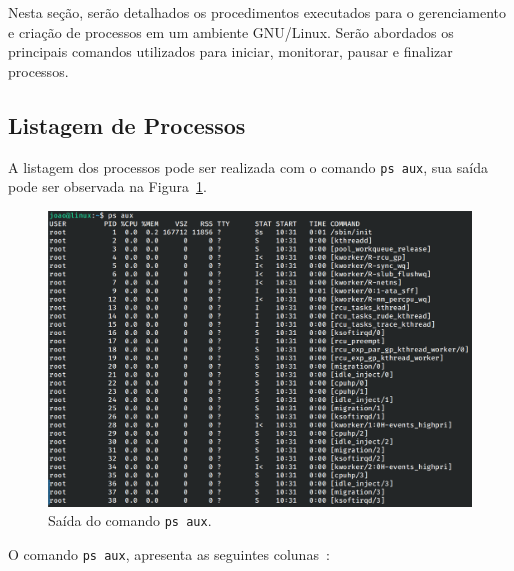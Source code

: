 \documentclass[
	12pt,				%
	oneside,   	        %
	a4paper,			%
	english,			%
	french,				%
	spanish,			%
	brazil,				%
	]{pacotes/abntex2}
\begin{document}
Nesta seção, serão detalhados os procedimentos executados para o gerenciamento e criação de processos em um ambiente GNU/Linux. Serão abordados os principais comandos utilizados para iniciar, monitorar, pausar e finalizar processos.

\subsection{Listagem de Processos}
\label{subsec:proc}

A listagem dos processos pode ser realizada com o comando \texttt{ps aux}, sua saída pode ser observada na Figura~\ref{fig:ps}.

\begin{figure}[H]
  \centering
  \includegraphics[scale=0.45]{figuras/ps.png}
  \caption{Saída do comando \texttt{ps aux}.}
  \label{fig:ps}
\end{figure}

O comando \texttt{ps aux}, apresenta as seguintes colunas~\cite{shotts2017}:
\end{document}
